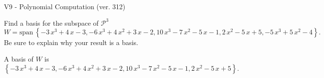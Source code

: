 \begin{exercise}
  \begin{exerciseTitle}V9 - Polynomial Computation (ver. 312)\end{exerciseTitle}
  \begin{exerciseStatement}
    Find a basis for the subspace of \(\mathcal{P}^3\) 
\[W=\mathrm{span}\ \left\{-3 \, x^{3} + 4 \, x - 3 , -6 \, x^{3} + 4 \, x^{2} + 3 \, x - 2 , 10 \, x^{3} - 7 \, x^{2} - 5 \, x - 1 , 2 \, x^{2} - 5 \, x + 5 , -5 \, x^{3} + 5 \, x^{2} - 4\right\}.\]
 Be sure to explain why your result is a basis.


  \end{exerciseStatement}
  \begin{exerciseAnswer}
   A basis of \(W\) is  \(\left\{-3 \, x^{3} + 4 \, x - 3 , -6 \, x^{3} + 4 \, x^{2} + 3 \, x - 2 , 10 \, x^{3} - 7 \, x^{2} - 5 \, x - 1 , 2 \, x^{2} - 5 \, x + 5\right\}\).
  


  \end{exerciseAnswer}
\end{exercise}
